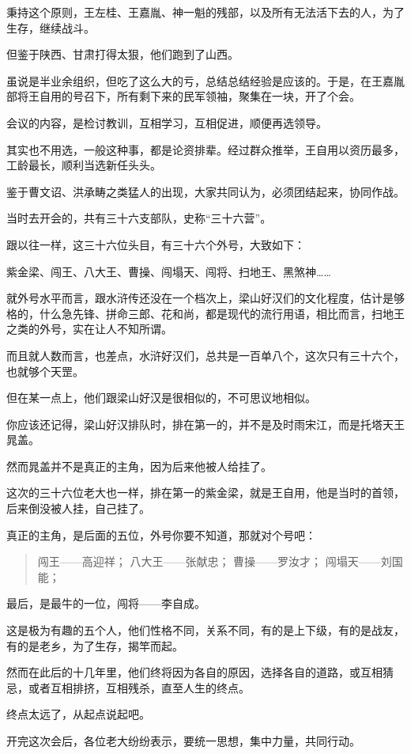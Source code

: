 \begin{multicols}{\theparacolNo}
秉持这个原则，王左桂、王嘉胤、神一魁的残部，以及所有无法活下去的人，为了生存，继续战斗。

但鉴于陕西、甘肃打得太狠，他们跑到了山西。

虽说是半业余组织，但吃了这么大的亏，总结总结经验是应该的。于是，在王嘉胤部将王自用的号召下，所有剩下来的民军领袖，聚集在一块，开了个会。

会议的内容，是检讨教训，互相学习，互相促进，顺便再选领导。

其实也不用选，一般这种事，都是论资排辈。经过群众推举，王自用以资历最多，工龄最长，顺利当选新任头头。

鉴于曹文诏、洪承畴之类猛人的出现，大家共同认为，必须团结起来，协同作战。

当时去开会的，共有三十六支部队，史称“三十六营”。

跟以往一样，这三十六位头目，有三十六个外号，大致如下：

紫金梁、闯王、八大王、曹操、闯塌天、闯将、扫地王、黑煞神……

就外号水平而言，跟水浒传还没在一个档次上，梁山好汉们的文化程度，估计是够格的，什么急先锋、拼命三郎、花和尚，都是现代的流行用语，相比而言，扫地王之类的外号，实在让人不知所谓。

而且就人数而言，也差点，水浒好汉们，总共是一百单八个，这次只有三十六个，也就够个天罡。

但在某一点上，他们跟梁山好汉是很相似的，不可思议地相似。

你应该还记得，梁山好汉排队时，排在第一的，并不是及时雨宋江，而是托塔天王晁盖。

然而晁盖并不是真正的主角，因为后来他被人给挂了。

这次的三十六位老大也一样，排在第一的紫金梁，就是王自用，他是当时的首领，后来倒没被人挂，自己挂了。

真正的主角，是后面的五位，外号你要不知道，那就对个号吧：
{\footnotesize \begin{quote}
	闯王——高迎祥；
	八大王——张献忠；
	曹操——罗汝才；
	闯塌天——刘国能；
\end{quote}}

最后，是最牛的一位，闯将——李自成。

这是极为有趣的五个人，他们性格不同，关系不同，有的是上下级，有的是战友，有的是老乡，为了生存，揭竿而起。

然而在此后的十几年里，他们终将因为各自的原因，选择各自的道路，或互相猜忌，或者互相排挤，互相残杀，直至人生的终点。

终点太远了，从起点说起吧。

开完这次会后，各位老大纷纷表示，要统一思想，集中力量，共同行动。


\end{multicols}
